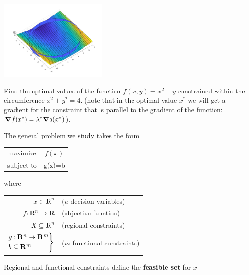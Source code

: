 \documentclass[c]{beamer}
\begin{document}
\begin{frame}
  \begin{center}
  \includegraphics[width=0.4\textwidth]{../figures/Lagrangex2minusy.png}
  \end{center}
  \begin{Exercise}
  Find the optimal values of the function $f(x,y)=x^2-y$ constrained within the circumference $x^2+y^2=4$. (note that in the optimal value $x^*$ we will get a gradient for the constraint that is parallel to the gradient of the function: $\grad f(x^*)=\lambda^* \grad g(x^*)$).
\end{Exercise}
\end{frame}
\begin{frame}
  The general problem we study takes the form
  \begin{center}
  \begin{tabular}{cc}
    maximize & $f(x)$ \\
    subject to & g(x)=b
  \end{tabular}
\end{center}
where
  \begin{center}
  \begin{tabular}{rl}
    $x \in \mathbf{R}^n$ & ($n$ decision variables)\\
    $f: \mathbf{R}^n \rightarrow \mathbf{R}$ & (objective function)\\
    $X \subseteq  \mathbf{R}^n$ & (regional constraints) \\
    $\begin{rcases}
      g: \mathbf{R}^n \rightarrow \mathbf{R}^m\\
      b \subseteq \mathbf{R}^m
    \end{rcases}$ & ($m$ functional constraints)\\
  \end{tabular}
\end{center}
Regional and functional constraints define the {\bf feasible set} for $x$

\end{frame}
\end{document}
